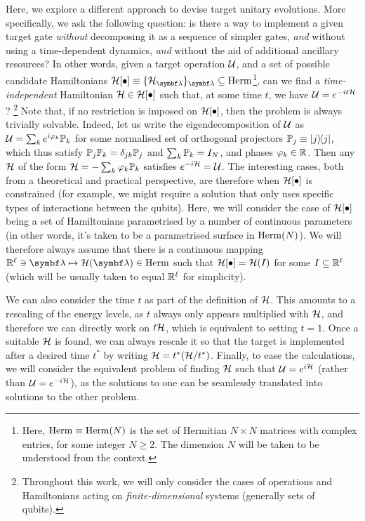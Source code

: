 Here, we explore a different approach to devise target unitary evolutions. More specifically, we ask the following question: is there a way to implement a given target gate \emph{without} decomposing it as a sequence of simpler gates, \emph{and} without using a time-dependent dynamics, \emph{and} without the aid of additional ancillary resources?
In other words, given a target operation ${\mathcal{U}}$, and a set of possible candidate Hamiltonians $\setOfHamiltonians\equiv \{\calH_{\bs\lambda}\}_{\bs\lambda}\subseteq\on{Herm}$\footnote{Here, $\operatorname{Herm}\equiv\operatorname{Herm}(N)$ is the set of Hermitian $N\times N$ matrices with complex entries, for some integer $N\ge2$. The dimension $N$ will be taken to be understood from the context.},
can we find a \emph{time-independent} Hamiltonian ${\mathcal{H}}\in{\mathcal{H}}[\bullet]$ such that, at some time $t$, we have ${\mathcal{U}} = e^{-it {\mathcal{H}}}$?
\footnote{Throughout this work, we will only consider the cases of operations and Hamiltonians acting on \emph{finite-dimensional} systems (generally sets of qubits).}
Note that, if no restriction is imposed on ${\mathcal{H}}[\bullet]$, then the problem is always trivially solvable. Indeed, let us write the eigendecomposition of ${\mathcal{U}}$ as ${\mathcal{U}}=\sum_k e^{i\varphi_k}\mathbb{P}_k$ for some normalised set of orthogonal projectors $\mathbb{P}_j\equiv\ketbra j$, which thus satisfy $\mathbb{P}_j\mathbb{P}_k=\delta_{jk}\mathbb{P}_j$ and $\sum_k\mathbb{P}_k=I_N$, and phases $\varphi_k\in\mathbb{R}$.
Then any ${\mathcal{H}}$ of the form ${\mathcal{H}} = -\sum_k \varphi_k\mathbb P_k$ satisfies $e^{-i{\mathcal{H}}}={\mathcal{U}}$.
The interesting cases, both from a theoretical and practical perspective, are therefore when ${\mathcal{H}}[\bullet]$ is constrained (for example, we might require a solution that only uses specific types of interactions between the qubits).
Here, we will consider the case of ${\mathcal{H}}[\bullet]$ being a set of Hamiltonians parametrised by a number of continuous parameters (in other words, it's taken to be a parametrised surface in $\operatorname{Herm}(N)$).
We will therefore always assume that there is a continuous mapping $\RR^\ell\ni\bs\lambda\mapsto\calH(\bs\lambda)\in\on{Herm}$ such that ${\mathcal{H}}[\bullet]={\mathcal{H}}(I)$ for some $I\subseteq\mathbb{R}^\ell$ (which will be usually taken to equal $\mathbb{R}^\ell$ for simplicity).

We can also consider the time $t$ as part of the definition of ${\mathcal{H}}$. This amounts to a rescaling of the energy levels, as $t$ always only appears multiplied with ${\mathcal{H}}$, and therefore we can directly work on $t{\mathcal{H}}$, which is equivalent to setting $t=1$. Once a suitable ${\mathcal{H}}$ is found, we can always rescale it so that the target is implemented after a desired time $t^*$ by writing ${\mathcal{H}}=t^*({\mathcal{H}}/t^*)$. Finally, to ease the calculations, we will consider the equivalent problem of finding ${\mathcal{H}}$ such that ${\mathcal{U}}=e^{i{\mathcal{H}}}$ (rather than ${\mathcal{U}}=e^{-i{\mathcal{H}}}$), as the solutions to one can be seamlessly translated into solutions to the other problem.

